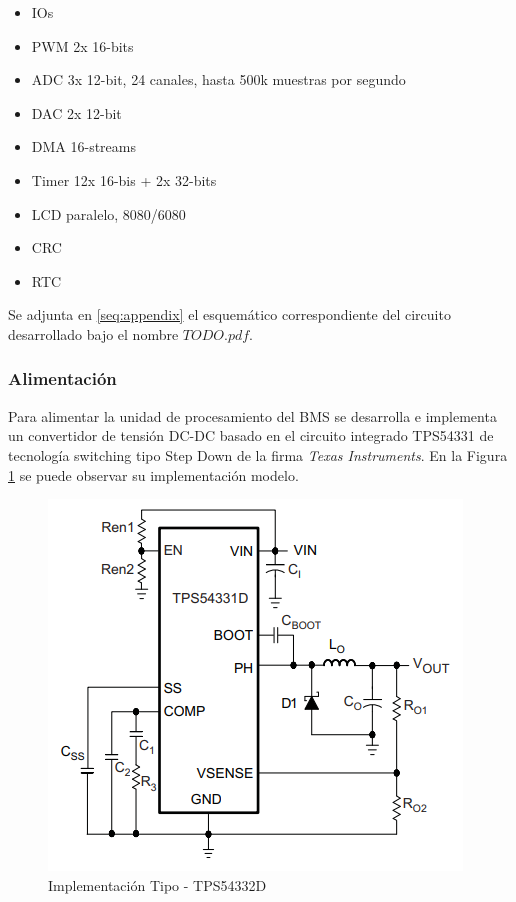 \documentclass[10pt,a4paper]{article}
\begin{document}
\begin{itemize}
    \item IOs
    \item PWM 2x 16-bits
    \item ADC 3x 12-bit, 24 canales, hasta 500k muestras por segundo              
    \item DAC 2x 12-bit 
    \item DMA 16-streams
    \item Timer 12x 16-bis + 2x 32-bits 
    \item LCD paralelo, 8080/6080 
    \item CRC
    \item RTC
\end{itemize}                                                                    
                                                                                 
Se adjunta en \autoref{seq:appendix} el esquemático correspondiente del circuito 
desarrollado bajo el nombre $TODO.pdf$.                   
                                                                                 
\subsubsection{Alimentación}

Para alimentar la unidad de procesamiento del \acrshort{BMS} se desarrolla e
implementa un convertidor de tensión DC-DC basado en el circuito integrado
TPS54331 de tecnología switching tipo Step Down de la firma \emph{Texas
Instruments}. En la Figura \ref{fig:TPS54332D_common_implementation} se puede
observar su implementación modelo. 

\begin{figure}[h!]
    \begin{center}
	\includegraphics[width=0.4\linewidth]{assets/TPS54332D_common_implementation.png}
	\caption{Implementación Tipo - TPS54332D}
	\label{fig:TPS54332D_common_implementation}
    \end{center}	
\end{figure}
\end{document}
